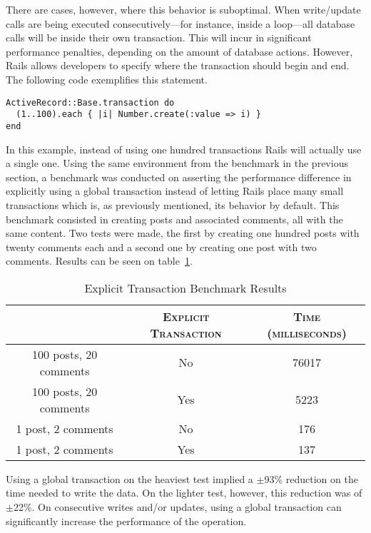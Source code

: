 There are cases, however, where this behavior is suboptimal. When write/update calls are being executed consecutively---for instance, inside a loop---all database calls will be inside their own transaction. This will incur in significant performance penalties, depending on the amount of database actions. However, Rails allows developers to specify where the transaction should begin and end. The following code exemplifies this statement.
\begin{lstlisting}[xleftmargin=30pt,xrightmargin=30pt]
ActiveRecord::Base.transaction do
  (1..100).each { |i| Number.create(:value => i) }
end
\end{lstlisting}
In this example, instead of using one hundred transactions Rails will actually use a single one. Using the same environment from the benchmark in the previous section, a benchmark was conducted on asserting the performance difference in explicitly using a global transaction instead of letting Rails place many small transactions which is, as previously mentioned, its behavior by default. This benchmark consisted in creating posts and associated comments, all with the same content. Two tests were made, the first by creating one hundred posts with twenty comments each and a second one by creating one post with two comments. Results can be seen on table~\ref{tab:transaction}.
\begin{table}[h!t]
  \centering
  \caption{Explicit Transaction Benchmark Results}
  \label{tab:transaction}
  
  \begin{tabular}{c|c|c}
  
    & \textbf{\textsc{Explicit Transaction}} & \textbf{\textsc{Time (milliseconds)}} \\ \hline
    100 posts, 20 comments & No & 76017 \\ \hline
    100 posts, 20 comments & Yes & 5223 \\ \hline
    1 post, 2 comments & No & 176 \\ \hline
    1 post, 2 comments & Yes & 137 \\
  \end{tabular}
\end{table}

Using a global transaction on the heaviest test implied a $\pm$93\% reduction on the time needed to write the data. On the lighter test, however, this reduction was of $\pm$22\%. On consecutive writes and/or updates, using a global transaction can significantly increase the performance of the operation.

